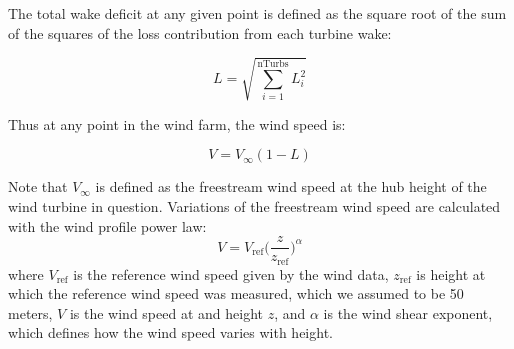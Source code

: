 The total wake deficit at any given point is defined as the square root of the sum of the squares of the loss contribution from each turbine wake:

\begin{equation}
L = \sqrt{\sum_{i=1}^\text{nTurbs}L_i^2}
\end{equation}

\noindent Thus at any point in the wind farm, the wind speed is:

\begin{equation}
V = V_\infty(1-L)
\end{equation}

\noindent Note that $V_\infty$ is defined as the freestream wind speed at the hub height of the wind turbine in question. Variations of the freestream wind speed are calculated with the wind profile power law: 
\begin{equation}
V = V_{\text{ref}}\Big(\frac{z}{z_{\text{ref}}}\Big)^\alpha
\label{Eq:shear}
\end{equation}
where $V_{\text{ref}}$ is the reference wind speed given by the wind data, $z_{\text{ref}}$ is height at which the reference wind speed was measured, which we assumed to be 50 meters, $V$ is the wind speed at and height $z$, and $\alpha$ is the wind shear exponent, which defines how the wind speed varies with height.